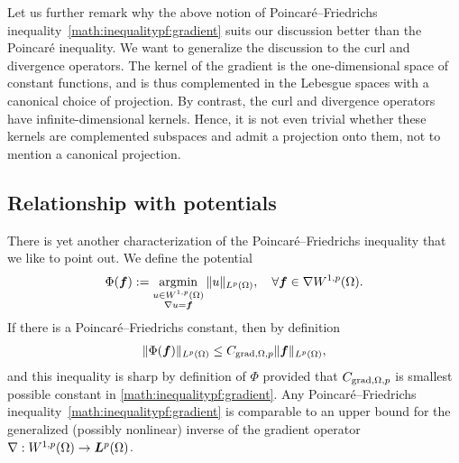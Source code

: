 \documentclass[10pt,a4paper]{article}
\begin{document}
\begin{remark}
    Let us further remark why the above notion of Poincar\'e--Friedrichs inequality~\eqref{math:inequalitypf:gradient} suits our discussion better than the Poincar\'e inequality. 
    We want to generalize the discussion to the curl and divergence operators. 
    The kernel of the gradient is the one-dimensional space of constant functions, and is thus complemented in the Lebesgue spaces with a canonical choice of projection. 
    By contrast, the curl and divergence operators have infinite-dimensional kernels. 
    Hence, it is not even trivial whether these kernels are complemented subspaces and admit a projection onto them, not to mention a canonical projection. 
\end{remark}





\subsection{Relationship with potentials}

There is yet another characterization of the Poincar\'e--Friedrichs inequality that we like to point out. 
We define the potential 
\begin{align*}
    \Phi( \bm{f} ) := \operatorname*{{\rm argmin}}\limits_{ \substack{ u \in W^{1,p}(\Omega) \\ \nabla u = \bm{f} } } \| u \|_{L^{p}(\Omega)},
    \quad 
    \forall 
    \bm{f} \in \nabla W^{1,p}(\Omega)
    .
\end{align*}
If there is a Poincar\'e--Friedrichs constant, then by definition
\begin{align*}
    \| \Phi(\bm{f}) \|_{L^{p}(\Omega)} \leq C_{\operatorname{grad},\Omega,p} \| \bm{f} \|_{L^{p}(\Omega)},
\end{align*}
and this inequality is sharp by definition of $\Phi$ provided that $C_{\operatorname{grad},\Omega,p}$ is smallest possible constant in \eqref{math:inequalitypf:gradient}. 
Any Poincar\'e--Friedrichs inequality~\eqref{math:inequalitypf:gradient} is comparable to an upper bound for the generalized (possibly nonlinear) inverse of the gradient operator $\nabla : W^{1,p}(\Omega) \rightarrow \bm{L}^{p}(\Omega)$. 
\end{document}
